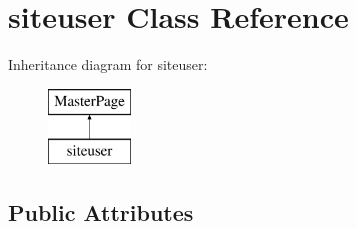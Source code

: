 \hypertarget{classsiteuser}{\section{siteuser Class Reference}
\label{classsiteuser}
}
Inheritance diagram for siteuser\-:\begin{figure}[H]
\begin{center}
\leavevmode
\includegraphics[height=2.000000cm]{classsiteuser}
\end{center}
\end{figure}
\subsection*{Public Attributes}
